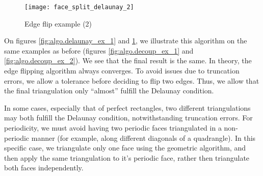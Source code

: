 \begin{figure}[!h]
\centerline{
\texttt{[image: face\_split\_delaunay\_2]}}
\caption{Edge flip example (2)}
\label{fig:algo.delaunay_ex_2}
\end{figure}

On figures \ref{fig:algo.delaunay_ex_1} and \ref{fig:algo.delaunay_ex_2},
we illustrate this algorithm on the same examples as before (figures
\ref{fig:algo.decoup_ex_1} and \ref{fig:algo.decoup_ex_2}). We see that
the final result is the same. In theory, the edge flipping algorithm
always converges. To avoid issues due to truncation errors, we allow
a tolerance before deciding to flip two edges. Thus, we allow that the
final triangulation only ``almost'' fulfill the Delaunay condition.

In some cases, especially that of perfect rectangles, two different
triangulations may both fulfill the Delaunay condition, notwithstanding
truncation errors. For periodicity, we must avoid having two periodic
faces triangulated in a non-periodic manner (for example, along
different diagonals of a quadrangle). In this specific case, we
triangulate only one face using the geometric algorithm, and then
apply the same triangulation to it's periodic face, rather then
triangulate both faces independently.
